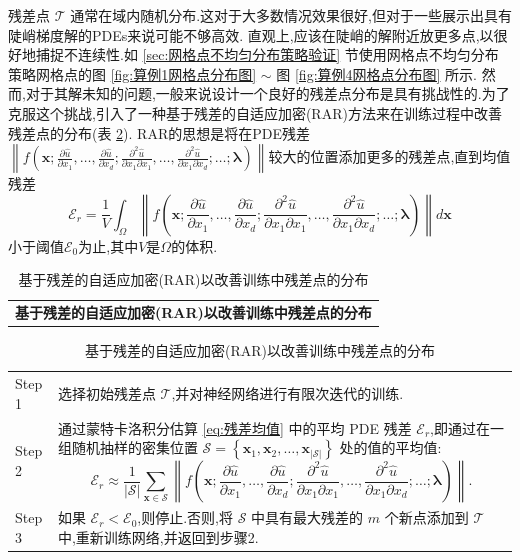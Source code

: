 \documentclass{Sichuan Normal University}
\begin{document}
残差点 $\mathcal{T}$ 通常在域内随机分布.这对于大多数情况效果很好,但对于一些展示出具有陡峭梯度解的PDEs来说可能不够高效.
直观上,应该在陡峭的解附近放更多点,以很好地捕捉不连续性.如 \ref{sec:网格点不均匀分布策略验证} 节使用网格点不均匀分布策略网格点的图 \ref{fig:算例1网格点分布图} $\sim$ 图 \ref{fig:算例4网格点分布图} 所示. 
然而,对于其解未知的问题,一般来说设计一个良好的残差点分布是具有挑战性的.为了克服这个挑战,引入了一种基于残差的自适应加密(RAR)方法\cite{luDeepXDEDeepLearning2021}来在训练过程中改善残差点的分布(表 \ref{tab:RAR}).
RAR的思想是将在PDE残差$\left\|f\left(\mathbf{x} ; \frac{\partial \hat{u}}{\partial x_1}, \ldots, \frac{\partial \hat{u}}{\partial x_d} ; \frac{\partial^2 \hat{u}}{\partial x_1 \partial x_1}, \ldots, \frac{\partial^2 \hat{u}}{\partial x_1 \partial x_d} ; \ldots ; \boldsymbol{\lambda}\right)\right\|$较大的位置添加更多的残差点,直到均值残差
\begin{equation}
\mathcal{E}_r=\frac{1}{V} \int_{\Omega}\left\|f\left(\mathbf{x} ; \frac{\partial \hat{u}}{\partial x_1}, \ldots, \frac{\partial \hat{u}}{\partial x_d} ; \frac{\partial^2 \hat{u}}{\partial x_1 \partial x_1}, \ldots, \frac{\partial^2 \hat{u}}{\partial x_1 \partial x_d} ; \ldots ; \boldsymbol{\lambda}\right)\right\| d \mathbf{x}
\label{eq:残差均值}
\end{equation}
小于阈值$\mathcal{E}_0$为止,其中$V$是$\Omega$的体积.

\begin{table}[H]
    \centering
    \caption{基于残差的自适应加密(RAR)以改善训练中残差点的分布}
    \begin{tabular}{p{}}
    \toprule
    \textbf{基于残差的自适应加密(RAR)以改善训练中残差点的分布} \\
\end{tabular}
    \begin{tabular}{p{}p{}}
    \midrule
    Step 1 & 选择初始残差点 $\mathcal{T}$,并对神经网络进行有限次迭代的训练. \\
    Step 2 & 通过蒙特卡洛积分估算 \eqref{eq:残差均值} 中的平均 PDE 残差 $\mathcal{E}_r$,即通过在一组随机抽样的密集位置 $\mathcal{S}=\left\{\mathbf{x}_1, \mathbf{x}_2, \ldots, \mathbf{x}_{|\mathcal{S}|}\right\}$ 处的值的平均值:
    \[
    \mathcal{E}_r \approx \frac{1}{|\mathcal{S}|} \sum_{\mathbf{x} \in \mathcal{S}}\left\|f\left(\mathbf{x} ; \frac{\partial \hat{u}}{\partial x_1}, \ldots, \frac{\partial \hat{u}}{\partial x_d} ; \frac{\partial^2 \hat{u}}{\partial x_1 \partial x_1}, \ldots, \frac{\partial^2 \hat{u}}{\partial x_1 \partial x_d} ; \ldots ; \boldsymbol{\lambda}\right)\right\| .
    \]
    \\
    Step 3 & 如果 $\mathcal{E}_r < \mathcal{E}_0$,则停止.否则,将 $\mathcal{S}$ 中具有最大残差的 $m$ 个新点添加到 $\mathcal{T}$ 中,重新训练网络,并返回到步骤2. \\
    \bottomrule
    \end{tabular}
    \label{tab:RAR}
\end{table}
\end{document}
